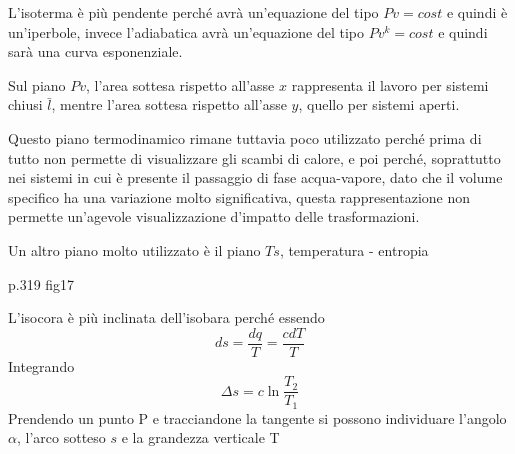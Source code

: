 \begin{adjustwidth}{2in}{}
	
	L'isoterma è più pendente perché avrà un'equazione del tipo $Pv=cost$ e quindi è un'iperbole, invece l'adiabatica avrà  un'equazione del tipo $Pv^k = cost$ e quindi sarà una curva esponenziale. 
	
	Sul  piano $Pv$, l'area sottesa rispetto all'asse $x$ rappresenta il lavoro per sistemi chiusi $\bar{l}$, mentre l'area sottesa rispetto all'asse $y$, quello per sistemi aperti. 
	
	Questo piano termodinamico rimane tuttavia poco utilizzato perché prima di tutto non permette di visualizzare gli scambi di calore, e poi perché, soprattutto nei sistemi in cui è presente il passaggio di fase acqua-vapore, dato che il volume specifico ha una variazione molto significativa, questa rappresentazione non permette un'agevole visualizzazione d'impatto delle trasformazioni.\newline 
	
	Un altro piano molto utilizzato è il piano $Ts$, temperatura - entropia 
	
	p.319 fig17
	
	L'isocora è più inclinata dell'isobara perché essendo 
	\[ds = \dfrac{dq}{T} =  \dfrac{cdT}{T}\]
	Integrando 
	\[\Delta s = c\ln\dfrac{T_2}{T_1} \]	
	Prendendo un punto P e tracciandone la tangente si possono individuare l'angolo $\alpha$, l'arco sotteso $s$ e la grandezza verticale T
	

\end{adjustwidth}
